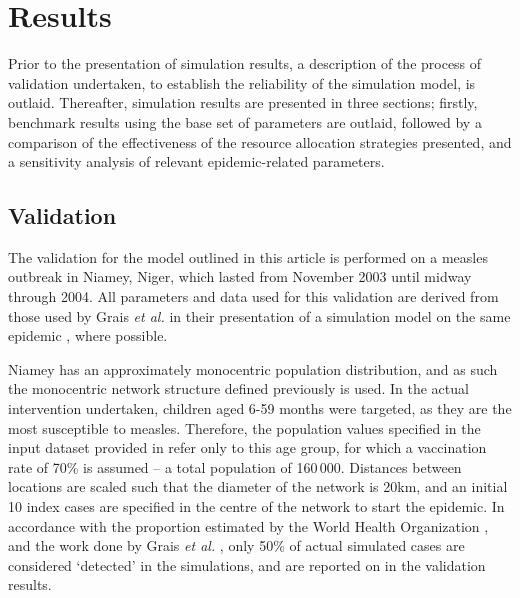 \documentclass[10pt,letterpaper]{article}
\begin{document}
\section*{Results}
Prior to the presentation of simulation results, a description of the process of validation undertaken, to establish the reliability of the simulation model, is outlaid. Thereafter, simulation results are presented in three sections; firstly, benchmark results using the base set of parameters are outlaid, followed by a comparison of the effectiveness of the resource allocation strategies presented, and a sensitivity analysis of relevant epidemic-related parameters.

\subsection*{Validation}
\label{res:validation}
The validation for the model outlined in this article is performed on a measles outbreak in Niamey, Niger, which lasted from November 2003 until midway through 2004. 
All parameters and data used for this validation are derived from those used by Grais \textit{et al.} in their presentation of a simulation model on the same epidemic \cite{grais2008time}, where possible.

Niamey has an approximately monocentric population distribution, and as such the monocentric network structure defined previously is used. In the actual intervention undertaken, children aged 6-59 months were targeted, as they are the most susceptible to measles. Therefore, the population values specified in the input dataset provided in  refer only to this age group, for which a vaccination rate of 70\% is assumed -- a total population of 160\,000. Distances between locations are scaled such that the diameter of the network is 20km, and an initial 10 index cases are specified in the centre of the network to start the epidemic.
In accordance with the proportion estimated by the World Health Organization \cite{msf_1999}, and the work done by Grais \textit{et al.} \cite{grais2008time}, only 50\% of actual simulated cases are considered `detected' in the simulations, and are reported on in the validation results.
\end{document}
